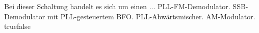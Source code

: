     {Bei dieser Schaltung handelt es sich um einen ...}
    {PLL-FM-Demodulator.}
    {SSB-Demodulator mit PLL-gesteuertem BFO.}
    {PLL-Abwärtsmischer.}
    {AM-Modulator.}
    {true}{false}